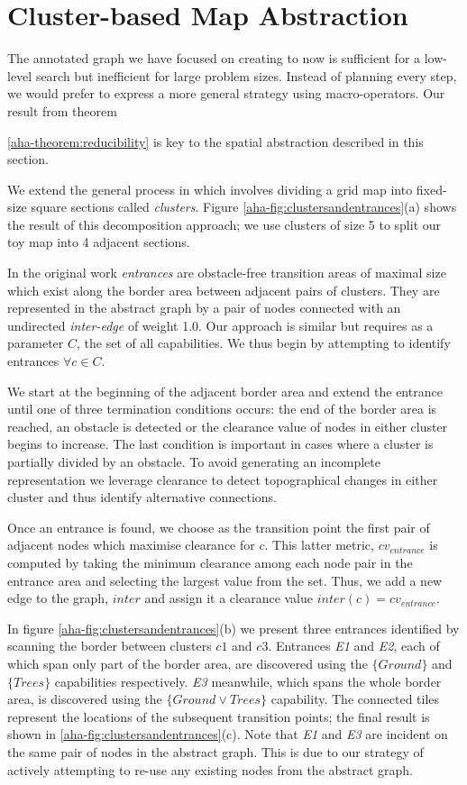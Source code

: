 \section{Cluster-based Map Abstraction}
\label{aha:mapabstraction}
The annotated graph we have focused on creating to now is sufficient for a low-level search but inefficient for large problem sizes. 
Instead of planning every step, we would prefer to express a more general strategy using macro-operators.
Our result from theorem {\ref{aha-theorem:reducibility} is key to the spatial abstraction described in this section. 
\par \indent
We extend the general process in \cite{botea04} which involves dividing a grid map into fixed-size square sections called \emph{clusters}. Figure \ref{aha-fig:clustersandentrances}(a) shows the result of this decomposition approach; we use clusters of size 5 to split our toy map into 4 adjacent sections.
\par \indent
In the original work \emph{entrances} are obstacle-free transition areas of maximal size which exist along the border area between adjacent pairs of clusters. 
They are represented in the abstract graph by a pair of nodes connected with an undirected \emph{inter-edge} of weight 1.0. 
Our approach is similar but requires as a parameter $C$, the set of all capabilities. 
We thus begin by attempting to identify entrances $\forall c \in C$. 
\par \indent
We start at the beginning of the adjacent border area and extend the entrance until one of three termination conditions occurs: the end of the border area is reached, an obstacle is detected or the clearance value of nodes in either cluster begins to increase. 
The last condition is important in cases where a cluster is partially divided by an obstacle. 
To avoid generating an incomplete representation we leverage clearance to detect topographical changes in either cluster and thus identify alternative connections.
\par \indent
Once an entrance is found, we choose as the transition point the first pair of adjacent nodes which maximise clearance for $c$. 
This latter metric, $cv_{entrance}$ is computed by taking the minimum clearance among each node pair in the entrance area and selecting the largest value from the set. 
Thus, we add a new edge to the graph, $inter$ and assign it a clearance value $inter(c) = cv_{entrance}$. 
\par \indent
In figure \ref{aha-fig:clustersandentrances}(b) we present three entrances identified by scanning the border between clusters $c1$ and $c3$.
Entrances \emph{E1} and \emph{E2}, each of which span only part of the border area, are discovered using the $\lbrace Ground \rbrace$ and $\lbrace Trees \rbrace$ capabilities respectively. 
\emph{E3} meanwhile, which spans the whole border area, is discovered using the $\lbrace Ground \vee Trees \rbrace$ capability. 
The connected tiles represent the locations of the subsequent transition points; the final result is shown in \ref{aha-fig:clustersandentrances}(c). 
Note that \emph{E1} and \emph{E3} are incident on the same pair of nodes in the abstract graph. This is due to our  strategy of actively attempting to re-use any existing nodes from the abstract graph. 

}
